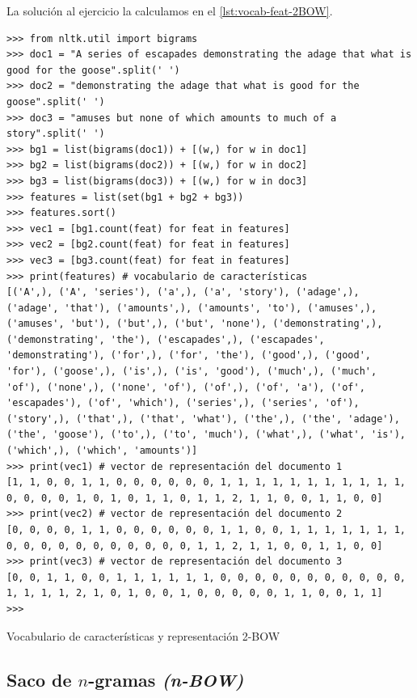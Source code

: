 La solución al ejercicio la calculamos en el \autoref{lst:vocab-feat-2BOW}.

\begin{listing}[htbp]
\begin{verbatim}
>>> from nltk.util import bigrams
>>> doc1 = "A series of escapades demonstrating the adage that what is good for the goose".split(' ')
>>> doc2 = "demonstrating the adage that what is good for the goose".split(' ')
>>> doc3 = "amuses but none of which amounts to much of a story".split(' ')
>>> bg1 = list(bigrams(doc1)) + [(w,) for w in doc1]
>>> bg2 = list(bigrams(doc2)) + [(w,) for w in doc2]
>>> bg3 = list(bigrams(doc3)) + [(w,) for w in doc3]
>>> features = list(set(bg1 + bg2 + bg3))
>>> features.sort()
>>> vec1 = [bg1.count(feat) for feat in features]
>>> vec2 = [bg2.count(feat) for feat in features]
>>> vec3 = [bg3.count(feat) for feat in features]
>>> print(features) # vocabulario de características
[('A',), ('A', 'series'), ('a',), ('a', 'story'), ('adage',), ('adage', 'that'), ('amounts',), ('amounts', 'to'), ('amuses',), ('amuses', 'but'), ('but',), ('but', 'none'), ('demonstrating',), ('demonstrating', 'the'), ('escapades',), ('escapades', 'demonstrating'), ('for',), ('for', 'the'), ('good',), ('good', 'for'), ('goose',), ('is',), ('is', 'good'), ('much',), ('much', 'of'), ('none',), ('none', 'of'), ('of',), ('of', 'a'), ('of', 'escapades'), ('of', 'which'), ('series',), ('series', 'of'), ('story',), ('that',), ('that', 'what'), ('the',), ('the', 'adage'), ('the', 'goose'), ('to',), ('to', 'much'), ('what',), ('what', 'is'), ('which',), ('which', 'amounts')]
>>> print(vec1) # vector de representación del documento 1
[1, 1, 0, 0, 1, 1, 0, 0, 0, 0, 0, 0, 1, 1, 1, 1, 1, 1, 1, 1, 1, 1, 1, 0, 0, 0, 0, 1, 0, 1, 0, 1, 1, 0, 1, 1, 2, 1, 1, 0, 0, 1, 1, 0, 0]
>>> print(vec2) # vector de representación del documento 2
[0, 0, 0, 0, 1, 1, 0, 0, 0, 0, 0, 0, 1, 1, 0, 0, 1, 1, 1, 1, 1, 1, 1, 0, 0, 0, 0, 0, 0, 0, 0, 0, 0, 0, 1, 1, 2, 1, 1, 0, 0, 1, 1, 0, 0]
>>> print(vec3) # vector de representación del documento 3
[0, 0, 1, 1, 0, 0, 1, 1, 1, 1, 1, 1, 0, 0, 0, 0, 0, 0, 0, 0, 0, 0, 0, 1, 1, 1, 1, 2, 1, 0, 1, 0, 0, 1, 0, 0, 0, 0, 0, 1, 1, 0, 0, 1, 1]
>>> 
\end{verbatim}
\caption{Vocabulario de características y representación 2-BOW}
\label{lst:vocab-feat-2BOW}
\end{listing}

\subsection{Saco de $n$-gramas \emph{(n-BOW)}}

